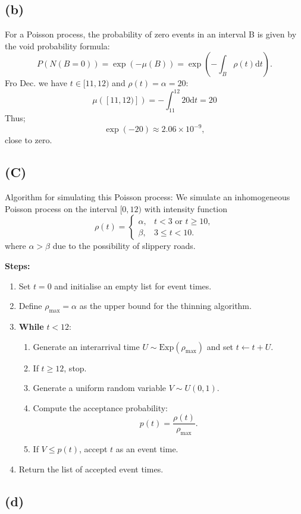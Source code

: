 \documentclass{article}
\begin{document}
\subsection*{(b)}
For a Poisson process, the probability of zero events in an interval B is given by the void probability formula:
\[
P(N(B=0))=\exp(-\mu(B))=\exp(-\int_B \rho(t)\text{d}t).
\]
Fro Dec. we have $t\in [11,12)$ and $\rho(t)=\alpha=20$:
\[
    \mu([11,12)])=-\int_{11}^{12} 20 \text{d}t=20
\]
Thus;
\[
\exp(-20)\approx 2.06\times10^{-9},
\]
close to zero.
\subsection*{(C)}
Algorithm for simulating this Poisson process:
We simulate an inhomogeneous Poisson process on the interval $[0,12)$ with intensity function  
\[
\rho(t) =
\begin{cases}
\alpha, & t < 3 \text{ or } t \geq 10, \\
\beta, & 3 \leq t < 10.
\end{cases}
\]
where $\alpha > \beta$ due to the possibility of slippery roads.

\textbf{Steps:}
\begin{enumerate}
    \item Set $t = 0$ and initialise an empty list for event times.
    \item Define $\rho_{\max} = \alpha$ as the upper bound for the thinning algorithm.
    \item \textbf{While} $t < 12$:
    \begin{enumerate}
        \item Generate an interarrival time $U \sim \text{Exp}(\rho_{\max})$ and set $t \leftarrow t + U$.
        \item If $t \geq 12$, stop.
        \item Generate a uniform random variable $V \sim U(0,1)$.
        \item Compute the acceptance probability:  
        \[
        p(t) = \frac{\rho(t)}{\rho_{\max}}.
        \]
        \item If $V \leq p(t)$, accept $t$ as an event time.
    \end{enumerate}
    \item Return the list of accepted event times.
\end{enumerate}

\subsection*{(d)}
\end{document}
